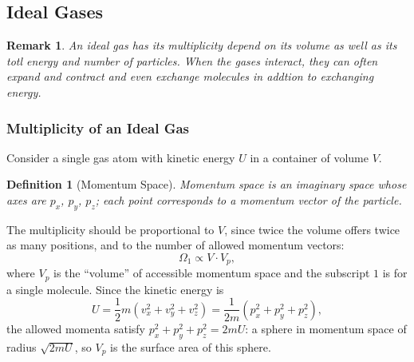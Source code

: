 \documentclass{article}
\newtheorem{definition}{Definition}
\newtheorem{remark}{Remark}
\begin{document}
\subsection{Ideal Gases}
\begin{remark}
    An ideal gas has its multiplicity depend on its volume as well as its totl energy and number of particles. When the gases interact, they can often expand and contract and even exchange molecules in addtion to exchanging energy.
\end{remark}

\subsubsection{Multiplicity of an Ideal Gas}
Consider a single gas atom with kinetic energy $U$ in a container of volume $V$.
\begin{definition}[Momentum Space]
    Momentum space is an imaginary space whose axes are $p_x$, $p_y$, $p_z$; each point corresponds to a momentum vector of the particle.
\end{definition}
The multiplicity should be proportional to $V$, since twice the volume offers twice as many positions, and to the number of allowed momentum vectors:
\[\Omega_1 \propto V \cdot V_p,\]
where $V_p$ is the ``volume'' of accessible momentum space and the subscript $1$ is for a single molecule. Since the kinetic energy is
\[U = \frac{1}{2}m\left(v_x^2 + v_y^2 + v_z^2\right) = \frac{1}{2m}\left(p_x^2 + p_y^2 + p_z^2\right),\]
the allowed momenta satisfy $p_x^2 + p_y^2 + p_z^2 = 2mU$: a sphere in momentum space of radius $\sqrt{2mU}$, so $V_p$ is the surface area of this sphere.
\end{document}
